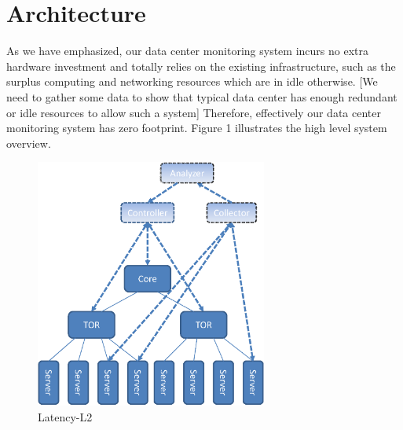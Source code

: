 \documentclass{acm_proc_article-sp}
\begin{document}
\section{Architecture}
As we have emphasized, our data center monitoring system incurs no extra hardware investment and totally relies on the existing infrastructure, such as the surplus computing and networking resources which are in idle otherwise. [We need to gather some data to show that typical data center has enough redundant or idle resources to allow such a system] Therefore, effectively our data center monitoring system has zero footprint. Figure 1 illustrates the high level system overview.\\
\begin{figure}[htbp]
\includegraphics[width=3in]{image/arch}
\caption{Latency-L2}\label{fig:latency-l2}
\end{figure}
\end{document}
